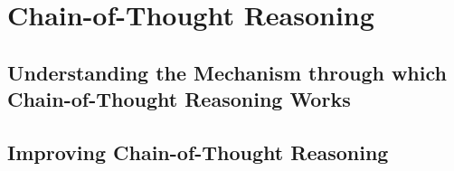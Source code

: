 \section{Chain-of-Thought Reasoning}

\subsection{Understanding the Mechanism through which Chain-of-Thought Reasoning Works}
\subsection{Improving Chain-of-Thought Reasoning}
